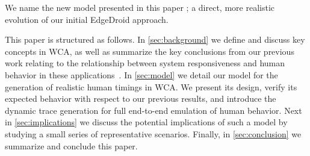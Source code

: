 We name the new model presented in this paper \emph{\edgedroid}; a direct, more realistic evolution of our initial EdgeDroid approach.

This paper is structured as follows.
In \cref{sec:background} we define and discuss key concepts in \ac{WCA}, as well as summarize the key conclusions from our previous work relating to the relationship between system responsiveness and human behavior in these applications~\cite{olguinmunoz:impact2021}.
In \cref{sec:model} we detail our model for the generation of realistic human timings in \ac{WCA}.
We present its design, verify its expected behavior with respect to our previous results, and introduce the dynamic trace generation for full end-to-end emulation of human behavior.
Next in \cref{sec:implications} we discuss the potential implications of such a model by studying a small series of representative scenarios.
Finally, in \cref{sec:conclusion} we summarize and conclude this paper.